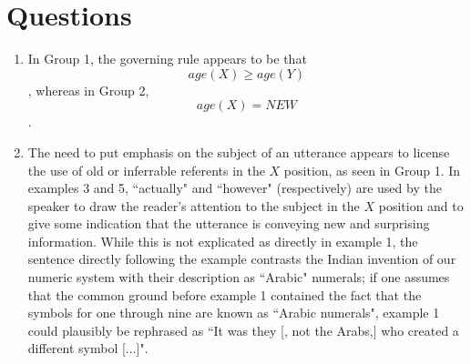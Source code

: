 \documentclass[12pt,a4paper]{article}
\begin{document}
\section{Questions}
\begin{enumerate}

\item In Group 1, the governing rule appears to be that \[
age(X) \geq age(Y)
\], whereas in Group 2, \[
age(X) = NEW
\].

\item The need to put emphasis on the subject of an utterance appears to license the use of old or inferrable referents in the $X$ position, as seen in Group 1. In examples 3 and 5, ``actually" and ``however" (respectively) are used by the speaker to draw the reader's attention to the subject in the $X$ position and to give some indication that the utterance is conveying new and surprising information. While this is not explicated as directly in example 1, the sentence directly following the example contrasts the Indian invention of our numeric system with their description as ``Arabic" numerals; if one assumes that the common ground before example 1 contained the fact that the symbols for one through nine are known as ``Arabic numerals", example 1 could plausibly be rephrased as ``It was they [, not the Arabs,] who created a different symbol [...]".

\end{enumerate}
\end{document}
